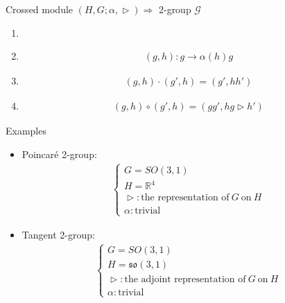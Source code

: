 \documentclass[12pt,aspectratio=53,mathserif]{beamer}
\begin{document}
		 \begin{frame}
            {Crossed module $\left(H,G;\alpha,\vartriangleright \right) \Longrightarrow$ 2-group $\mathcal{G}$ }
            \begin{enumerate}
                \item {}
                \item {}
                \begin{align*}
                    (g,h):g \rightarrow \alpha(h)g
                \end{align*}
            \item {}
            \begin{align}
                (g,h)\cdot(g',h)=(g',hh')
            \end{align}
        \item {}
       \begin{align}
           (g,h) \circ (g',h)=(gg',h g \vartriangleright h')
       \end{align}
            \end{enumerate}
        \end{frame}
		
	\begin{frame}
		{\color{blue}Examples}
			\begin{itemize}
				\item Poincar\'e 2-group:
				    \begin{align*} 
				\begin{cases}
				G = SO(3,1)\\
				H = \mathbb{R}^4\\
				\vartriangleright: \text{the representation of} \ G \ \text{on} \ H\\
				\alpha: \text{trivial}
				\end{cases}
				     \end{align*}
				\item Tangent 2-group: 
				     \begin{align*} 
				\begin{cases}
				G = SO(3,1)\\
				H = \mathfrak{so}(3,1)\\
				\vartriangleright: \text{the adjoint representation of} \ G \ \text{on} \ H \\
				\alpha : \text{trivial}
				\end{cases}
				     \end{align*}
			\end{itemize}
	\end{frame}
	
\end{document}
